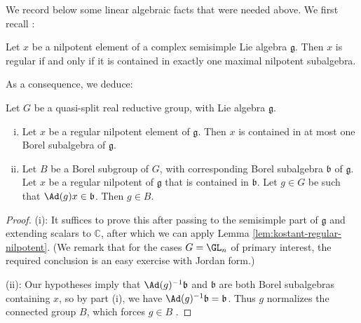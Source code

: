We record below some linear algebraic facts that were needed above.  We first recall
\cite[Cor 5.6]{MR0114875}:
\begin{lemma}\label{lem:kostant-regular-nilpotent}
  Let $x$ be a nilpotent element of a complex semisimple Lie algebra $\mathfrak{g}$.  Then $x$ is regular if and only if it is contained in exactly one maximal nilpotent subalgebra.
\end{lemma}
As a consequence, we deduce:
\begin{lemma}\label{lem:scratch-research:let-mathfrakb-be}
  Let $G$ be a quasi-split real reductive group, with Lie algebra $\mathfrak{g}$.
  \begin{enumerate}[(i)]
  \item \label{itm:scratch-research:lemma-general-linear-remedial} Let $x$ be a regular nilpotent element of $\mathfrak{g}$.  Then $x$ is contained in at most one Borel subalgebra of $\mathfrak{g}$.
  \item Let $B$ be a Borel subgroup of $G$, with corresponding Borel subalgebra $\mathfrak{b}$ of $\mathfrak{g}$.  Let $x$ be a regular nilpotent of $\mathfrak{g}$ that is contained in $\mathfrak{b}$.  Let $g \in G$ be such that $\Ad(g) x \in \mathfrak{b}$.  Then $g \in B$.
  \end{enumerate}
\end{lemma}
\begin{proof}
  (i): It suffices to prove this after passing to the semisimple part of $\mathfrak{g}$ and extending scalars to $\mathbb{C}$, after which we can apply Lemma \ref{lem:kostant-regular-nilpotent}.  (We remark that for the cases $G = \GL_n$ of primary interest, the required conclusion is an easy exercise with Jordan form.)


  (ii): Our hypotheses imply that $\Ad(g)^{-1} \mathfrak{b}$ and $\mathfrak{b}$ are both Borel subalgebras containing $x$, so by part (i), we have $\Ad(g)^{-1} \mathfrak{b} = \mathfrak{b}$.  Thus $g$ normalizes the connected group $B$, which forces $g \in B$ \cite[Thm 11.16]{MR1102012}.
\end{proof}

